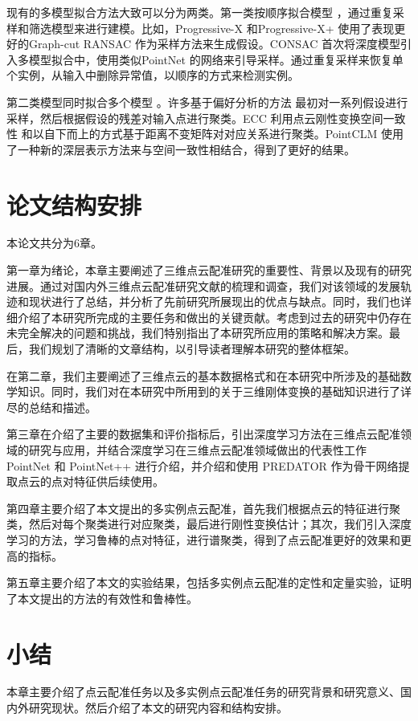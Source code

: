 现有的多模型拟合方法大致可以分为两类。第一类按顺序拟合模型 \cite{barath2019progressive,barath2021progressive,kanazawa2004detection,kluger2020consac} ，通过重复采样和筛选模型来进行建模。比如，Progressive-X \cite{barath2019progressive} 和Progressive-X+ \cite{barath2021progressive} 使用了表现更好的Graph-cut RANSAC \cite{barath2018graph} 作为采样方法来生成假设。CONSAC \cite{kluger2020consac} 首次将深度模型引入多模型拟合中，使用类似PointNet \cite{qi2017pointnet} 的网络来引导采样。通过重复采样来恢复单个实例，从输入中删除异常值，以顺序的方式来检测实例。

第二类模型同时拟合多个模型 \cite{tang2022multi,toldo2008robust,magri2016multiple,magri2014t,magri2015robust} 。许多基于偏好分析的方法 \cite{toldo2008robust,magri2015robust} 最初对一系列假设进行采样，然后根据假设的残差对输入点进行聚类。ECC \cite{tang2022multi} 利用点云刚性变换空间一致性 \cite{leordeanu2005spectral} 和以自下而上的方式基于距离不变矩阵对对应关系进行聚类。PointCLM \cite{yuan2022pointclm} 使用了一种新的深层表示方法来与空间一致性相结合，得到了更好的结果。

\section{论文结构安排}
本论文共分为6章。

第一章为绪论，本章主要阐述了三维点云配准研究的重要性、背景以及现有的研究进展。通过对国内外三维点云配准研究文献的梳理和调查，我们对该领域的发展轨迹和现状进行了总结，并分析了先前研究所展现出的优点与缺点。同时，我们也详细介绍了本研究所完成的主要任务和做出的关键贡献。考虑到过去的研究中仍存在未完全解决的问题和挑战，我们特别指出了本研究所应用的策略和解决方案。最后，我们规划了清晰的文章结构，以引导读者理解本研究的整体框架。

在第二章，我们主要阐述了三维点云的基本数据格式和在本研究中所涉及的基础数学知识。同时，我们对在本研究中所用到的关于三维刚体变换的基础知识进行了详尽的总结和描述。

第三章在介绍了主要的数据集和评价指标后，引出深度学习方法在三维点云配准领域的研究与应用，并结合深度学习在三维点云配准领域做出的代表性工作 PointNet \cite{qi2017pointnet} 和 PointNet++ \cite{qi2017pointnet++} 进行介绍，并介绍和使用 PREDATOR \cite{huang2021predator} 作为骨干网络提取点云的点对特征供后续使用。

第四章主要介绍了本文提出的多实例点云配准，首先我们根据点云的特征进行聚类，然后对每个聚类进行对应聚类，最后进行刚性变换估计；其次，我们引入深度学习的方法，学习鲁棒的点对特征，进行谱聚类，得到了点云配准更好的效果和更高的指标。

第五章主要介绍了本文的实验结果，包括多实例点云配准的定性和定量实验，证明了本文提出的方法的有效性和鲁棒性。
\section{小结}
本章主要介绍了点云配准任务以及多实例点云配准任务的研究背景和研究意义、国内外研究现状。然后介绍了本文的研究内容和结构安排。
